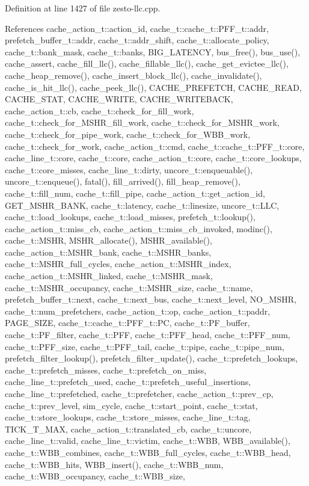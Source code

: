 Definition at line 1427 of file zesto-llc.cpp.

References cache\_\-action\_\-t::action\_\-id, cache\_\-t::cache\_\-t::PFF\_\-t::addr, prefetch\_\-buffer\_\-t::addr, cache\_\-t::addr\_\-shift, cache\_\-t::allocate\_\-policy, cache\_\-t::bank\_\-mask, cache\_\-t::banks, BIG\_\-LATENCY, bus\_\-free(), bus\_\-use(), cache\_\-assert, cache\_\-fill\_\-llc(), cache\_\-fillable\_\-llc(), cache\_\-get\_\-evictee\_\-llc(), cache\_\-heap\_\-remove(), cache\_\-insert\_\-block\_\-llc(), cache\_\-invalidate(), cache\_\-is\_\-hit\_\-llc(), cache\_\-peek\_\-llc(), CACHE\_\-PREFETCH, CACHE\_\-READ, CACHE\_\-STAT, CACHE\_\-WRITE, CACHE\_\-WRITEBACK, cache\_\-action\_\-t::cb, cache\_\-t::check\_\-for\_\-fill\_\-work, cache\_\-t::check\_\-for\_\-MSHR\_\-fill\_\-work, cache\_\-t::check\_\-for\_\-MSHR\_\-work, cache\_\-t::check\_\-for\_\-pipe\_\-work, cache\_\-t::check\_\-for\_\-WBB\_\-work, cache\_\-t::check\_\-for\_\-work, cache\_\-action\_\-t::cmd, cache\_\-t::cache\_\-t::PFF\_\-t::core, cache\_\-line\_\-t::core, cache\_\-t::core, cache\_\-action\_\-t::core, cache\_\-t::core\_\-lookups, cache\_\-t::core\_\-misses, cache\_\-line\_\-t::dirty, uncore\_\-t::enqueuable(), uncore\_\-t::enqueue(), fatal(), fill\_\-arrived(), fill\_\-heap\_\-remove(), cache\_\-t::fill\_\-num, cache\_\-t::fill\_\-pipe, cache\_\-action\_\-t::get\_\-action\_\-id, GET\_\-MSHR\_\-BANK, cache\_\-t::latency, cache\_\-t::linesize, uncore\_\-t::LLC, cache\_\-t::load\_\-lookups, cache\_\-t::load\_\-misses, prefetch\_\-t::lookup(), cache\_\-action\_\-t::miss\_\-cb, cache\_\-action\_\-t::miss\_\-cb\_\-invoked, modinc(), cache\_\-t::MSHR, MSHR\_\-allocate(), MSHR\_\-available(), cache\_\-action\_\-t::MSHR\_\-bank, cache\_\-t::MSHR\_\-banks, cache\_\-t::MSHR\_\-full\_\-cycles, cache\_\-action\_\-t::MSHR\_\-index, cache\_\-action\_\-t::MSHR\_\-linked, cache\_\-t::MSHR\_\-mask, cache\_\-t::MSHR\_\-occupancy, cache\_\-t::MSHR\_\-size, cache\_\-t::name, prefetch\_\-buffer\_\-t::next, cache\_\-t::next\_\-bus, cache\_\-t::next\_\-level, NO\_\-MSHR, cache\_\-t::num\_\-prefetchers, cache\_\-action\_\-t::op, cache\_\-action\_\-t::paddr, PAGE\_\-SIZE, cache\_\-t::cache\_\-t::PFF\_\-t::PC, cache\_\-t::PF\_\-buffer, cache\_\-t::PF\_\-filter, cache\_\-t::PFF, cache\_\-t::PFF\_\-head, cache\_\-t::PFF\_\-num, cache\_\-t::PFF\_\-size, cache\_\-t::PFF\_\-tail, cache\_\-t::pipe, cache\_\-t::pipe\_\-num, prefetch\_\-filter\_\-lookup(), prefetch\_\-filter\_\-update(), cache\_\-t::prefetch\_\-lookups, cache\_\-t::prefetch\_\-misses, cache\_\-t::prefetch\_\-on\_\-miss, cache\_\-line\_\-t::prefetch\_\-used, cache\_\-t::prefetch\_\-useful\_\-insertions, cache\_\-line\_\-t::prefetched, cache\_\-t::prefetcher, cache\_\-action\_\-t::prev\_\-cp, cache\_\-t::prev\_\-level, sim\_\-cycle, cache\_\-t::start\_\-point, cache\_\-t::stat, cache\_\-t::store\_\-lookups, cache\_\-t::store\_\-misses, cache\_\-line\_\-t::tag, TICK\_\-T\_\-MAX, cache\_\-action\_\-t::translated\_\-cb, cache\_\-t::uncore, cache\_\-line\_\-t::valid, cache\_\-line\_\-t::victim, cache\_\-t::WBB, WBB\_\-available(), cache\_\-t::WBB\_\-combines, cache\_\-t::WBB\_\-full\_\-cycles, cache\_\-t::WBB\_\-head, cache\_\-t::WBB\_\-hits, WBB\_\-insert(), cache\_\-t::WBB\_\-num, cache\_\-t::WBB\_\-occupancy, cache\_\-t::WBB\_\-size, 